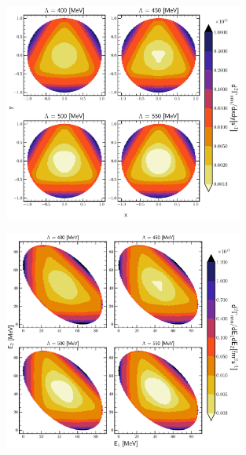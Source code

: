     \begin{figure}[h]
        \begin{center}
        \includegraphics[width=0.7\textwidth]{PlotData/PION/Dalitz_maps/figures/Dalitz_map_nnn_xy_cutofs.pdf}
        \end{center}
        \caption{}
        \label{pion_nnn_xy_cutoff}
    \end{figure}

    \begin{figure}[h]
        \begin{center}
        \includegraphics[width=0.7\textwidth]{PlotData/PION/Dalitz_maps/figures/Dalitz_map_nnn_E1E2_cutofs.pdf}
        \end{center}
        \caption{}
        \label{pion_nnn_E1E2_cutoff}
    \end{figure}

